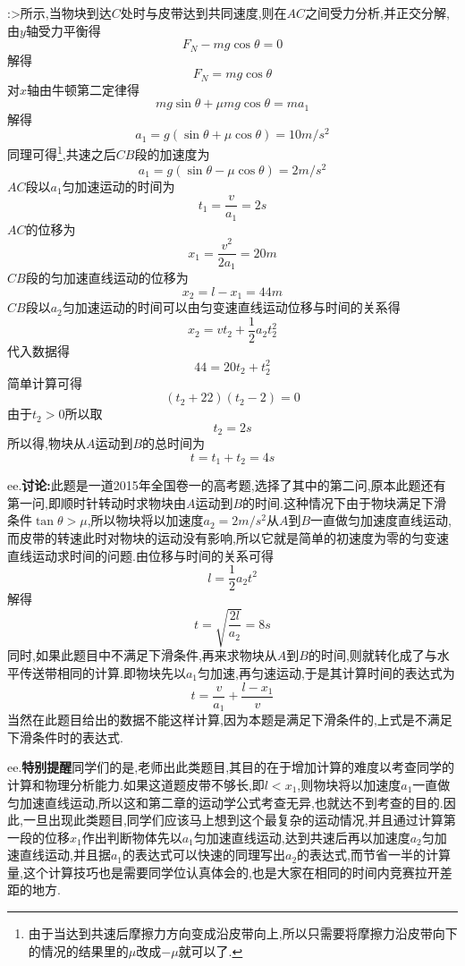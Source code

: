 \begin{calculate}
:>所示,当物块到达$C$处时与皮带达到共同速度,则在$AC$之间受力分析,并正交分解,由$y$轴受力平衡得
\[
  F_N-mg\cos\theta=0
\]
解得
\[
  F_N=mg\cos\theta
\]
对$x$轴由牛顿第二定律得
\[
  mg\sin\theta + \mu mg\cos\theta = ma_1
\]
解得
\[
  a_1=g(\sin\theta +\mu \cos\theta)=10m/s^2
\]
同理可得\footnote{由于当达到共速后摩擦力方向变成沿皮带向上,所以只需要将摩擦力沿皮带向下的情况的结果里的$\mu$改成$-\mu$就可以了.},共速之后$CB$段的加速度为
\[
  a_1=g(\sin\theta -\mu \cos\theta)=2m/s^2
\]
$AC$段以$a_1$匀加速运动的时间为
\[
  t_1=\frac{v}{a_1}=2s
\]
$AC$的位移为
\[
  x_1=\frac{v^2}{2a_1}=20m
\]
$CB$段的匀加速直线运动的位移为
\[
  x_2=l-x_1=44m
\]
$CB$段以$a_2$匀加速运动的时间可以由匀变速直线运动位移与时间的关系得
\[
  x_2=vt_2+\frac{1}{2}a_2t_2^2
\]
代入数据得
\[
  44=20t_2+t_2^2
\]
简单计算可得
\[
  (t_2+22)(t_2-2)=0
\]
由于$t_2>0$所以取
\[
  t_2=2s
\]
所以得,物块从$A$运动到$B$的总时间为
\[
  t=t_1+t_2=4s
\]

ee.{\bf 讨论:}此题是一道2015年全国卷一的高考题,选择了其中的第二问,原本此题还有第一问,即顺时针转动时求物块由$A$运动到$B$的时间.这种情况下由于物块满足下滑条件$\tan\theta >\mu$,所以物块将以加速度$a_2=2m/s^2$从$A$到$B$一直做匀加速度直线运动,而皮带的转速此时对物块的运动没有影响,所以它就是简单的初速度为零的匀变速直线运动求时间的问题.由位移与时间的关系可得
\[
  l=\frac{1}{2}a_2t^2
\]
解得
\[
  t=\sqrt{\frac{2l}{a_2}}=8s
\]
同时,如果此题目中不满足下滑条件,再来求物块从$A$到$B$的时间,则就转化成了与水平传送带相同的计算.即物块先以$a_1$匀加速,再匀速运动,于是其计算时间的表达式为
\[
  t=\frac{v}{a_1}+\frac{l-x_1}{v}
\]
当然在此题目给出的数据不能这样计算,因为本题是满足下滑条件的,上式是不满足下滑条件时的表达式.

ee.{\bf 特别提醒}同学们的是,老师出此类题目,其目的在于增加计算的难度以考查同学的计算和物理分析能力.如果这道题皮带不够长,即$l<x_1$,则物块将以加速度$a_1$一直做匀加速直线运动,所以这和第二章的运动学公式考查无异,也就达不到考查的目的.因此,一旦出现此类题目,同学们应该马上想到这个最复杂的运动情况,并且通过计算第一段的位移$x_1$作出判断物体先以$a_1$匀加速直线运动,达到共速后再以加速度$a_2$匀加速直线运动,并且据$a_1$的表达式可以快速的同理写出$a_2$的表达式,而节省一半的计算量,这个计算技巧也是需要同学位认真体会的,也是大家在相同的时间内竞赛拉开差距的地方.


\end{calculate}
